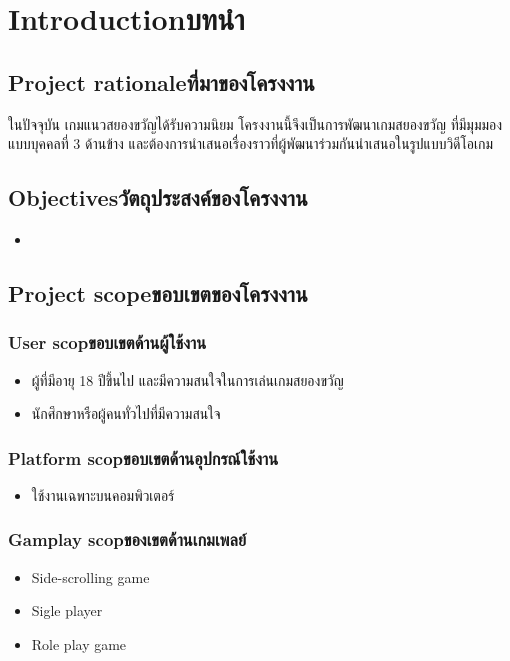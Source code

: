 \chapter{\ifenglish Introduction\else บทนำ\fi}

\section{\ifenglish Project rationale\else ที่มาของโครงงาน\fi}
ในปัจจุบัน เกมแนวสยองขวัญได้รับความนิยม โครงงานนี้จึงเป็นการพัฒนาเกมสยองขวัญ ที่มีมุมมองแบบบุคคลที่ 3 ด้านข้าง และต้องการนำเสนอเรื่องราวที่ผู้พัฒนาร่วมกันนำเสนอในรูปแบบวิดีโอเกม\par

\section{\ifenglish Objectives\else วัตถุประสงค์ของโครงงาน\fi}
\begin{itemize}
    \item 
\end{itemize}

\section{\ifenglish Project scope\else ขอบเขตของโครงงาน\fi}

\subsection{\ifenglish User scop\else ขอบเขตด้านผู้ใช้งาน\fi}
\begin{itemize}
    \item ผู้ที่มีอายุ 18 ปีขึ้นไป และมีความสนใจในการเล่นเกมสยองขวัญ
    \item นักศึกษาหรือผู้คนทั่วไปที่มีความสนใจ
\end{itemize}

\subsection{\ifenglish Platform scop\else ขอบเขตด้านอุปกรณ์ใช้งาน\fi}
\begin{itemize}
    \item ใช้งานเฉพาะบนคอมพิวเตอร์
\end{itemize}

\subsection{\ifenglish Gamplay scop\else ของเขตด้านเกมเพลย์\fi}
\begin{itemize}
    \item Side-scrolling game
    \item Sigle player
    \item Role play game
\end{itemize}

